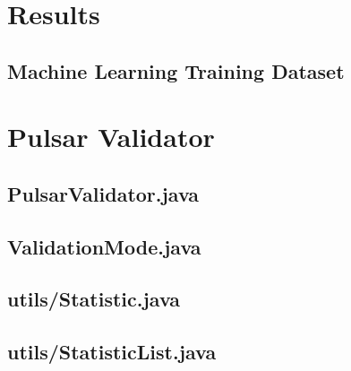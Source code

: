 \documentclass{article}
\begin{document}
\begin{appendices}
\begin{subappendices}
    \end{subappendices}

    \section{Results}
    \subsection{Machine Learning Training Dataset}
    \label{sec:training}
    

    \pagebreak
    \section{Pulsar Validator}
    \begin{subappendices}
        \label{src:pulsarvalidator} 
        \subsection{PulsarValidator.java}
        

        \pagebreak
        \subsection{ValidationMode.java}
        

        \pagebreak
        \subsection{utils/Statistic.java}
        

        \pagebreak
        \subsection{utils/StatisticList.java}
        


\end{subappendices}
\end{appendices}
\end{document}

